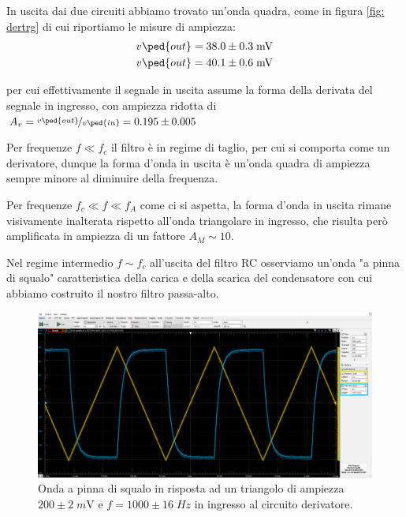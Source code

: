 \documentclass[10pt,a4paper]{article}
\begin{document}
In uscita dai due circuiti abbiamo trovato un'onda quadra, come in figura
\ref{fig: dertrg} di cui riportiamo le misure di ampiezza:
\begin{align*}
v\ped{out} &= 38.0 \pm 0.3 \; \si{m\V} \\
v\ped{out} &= 40.1 \pm 0.6 \; \si{m\V} 
\end{align*}

per cui effettivamente il segnale in uscita assume la forma della derivata
del segnale in ingresso, con ampiezza ridotta di
$A_v = \nicefrac{v\ped{out}}{v\ped{in}} = 0.195 \pm 0.005 $

Per frequenze $f \ll f_c$ il filtro è in regime di taglio, per cui si comporta
come un derivatore, dunque la forma d'onda in uscita è un'onda quadra di
ampiezza sempre minore al diminuire della frequenza.

Per frequenze $f_c \ll f \ll f_A$ come ci si aspetta, la forma d'onda in uscita
rimane visivamente inalterata rispetto all'onda triangolare in ingresso,
che risulta però amplificata in ampiezza di un fattore $A_M \sim 10$.

Nel regime intermedio $f \sim f_c$ all'uscita del filtro RC osserviamo un'onda
"a pinna di squalo" caratteristica della carica e della scarica del
condensatore con cui abbiamo costruito il nostro filtro passa-alto.
\begin{figure}[htbp]
\centering
\includegraphics[scale=0.335]{derfin}
\caption{Onda a pinna di squalo in risposta ad un triangolo di ampiezza
$200 \pm 2 \; \si{m\V}$ e $f = 1000 \pm 16 \; \si{Hz}$ in ingresso al
circuito derivatore. \label{fig: derfin}}
\end{figure}
\end{document}

